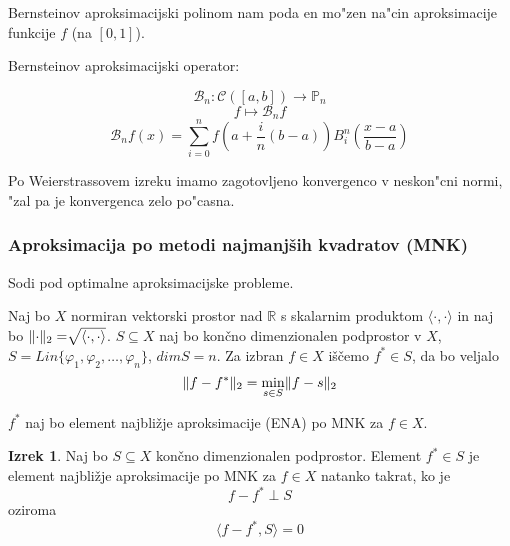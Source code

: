 \documentclass[a4paper,12pt]{article}
\DeclarePairedDelimiter\norm{\lVert}{\rVert}
\newcommand{\innerproduct}[2]{\langle #1, #2 \rangle}
\theoremstyle{definition}
\newtheorem{theorem}[counter]{Izrek}
\theoremstyle{remark}
\newcommand{\R}{\mathbb{R}}
\newcommand{\Pp}{\mathbb{P}}
\begin{document}
Bernsteinov aproksimacijski polinom nam poda en mo"zen na"cin aproksimacije funkcije $f$ (na $[0, 1]$).

Bernsteinov aproksimacijski operator:

\begin{equation*}
    \mathscr{B}_n : \mathscr{C} ([a, b]) \to \Pp_n
\end{equation*}
\begin{equation*}
    f \mapsto \mathscr{B}_n f
\end{equation*}
\begin{equation*}
    \mathscr{B}_n f(x) = \sum_{i = 0}^{n} f(a + \frac{i}{n}(b-a)) B_i^n (\frac{x-a}{b-a})
\end{equation*}

Po Weierstrassovem izreku imamo zagotovljeno konvergenco v neskon"cni normi, "zal pa je konvergenca zelo po"casna.



\subsubsection{Aproksimacija po metodi najmanjših kvadratov \- (MNK)}
Sodi pod optimalne aproksimacijske probleme.

Naj bo $X$ normiran vektorski prostor nad $\R$ s skalarnim produktom $\innerproduct{\cdot}{\cdot}$ in naj bo $\norm{\cdot}_2 = \sqrt[]{\innerproduct{\cdot}{\cdot}}$.
$S \subseteq X$ naj bo končno dimenzionalen podprostor v $X$, $S = Lin\{\varphi_1, \varphi_2, \dots, \varphi_n\}$, $dimS = n$. Za izbran $f \in X$ iščemo $f^* \in S$, da bo veljalo
\begin{equation*}
    \norm{f - f^*}_2 = \min_{s\in S} \norm{f - s}_2
\end{equation*}

$f^*$ naj bo element najbližje aproksimacije (ENA) po MNK za $f \in X$.

\begin{theorem}
    Naj bo $S \subseteq X$ končno dimenzionalen podprostor. Element $f^* \in S$ je element najbližje aproksimacije po MNK za $f \in X$ natanko takrat,
    ko je
    \begin{equation*}
        f - f^* \perp S
    \end{equation*}
    oziroma
    \begin{equation*}
        \innerproduct{f - f^*}{S} = 0
    \end{equation*}
\end{theorem}
\end{document}
